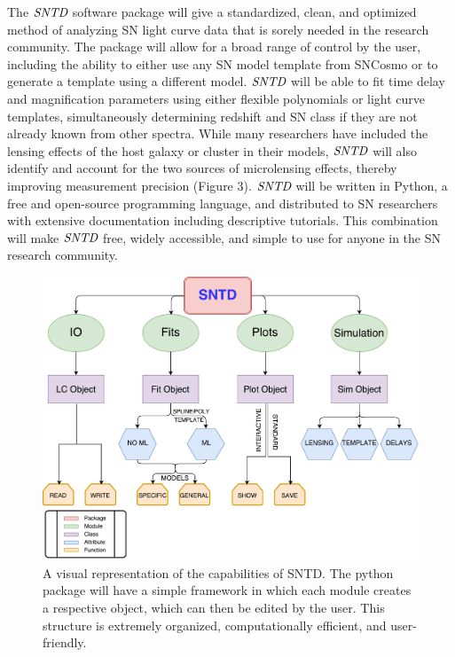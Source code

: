The $\textit{SNTD}$ software package will give a standardized, clean, and optimized method of analyzing SN light curve data that is sorely needed in the research community. The package will allow for a broad range of control by the user, including the ability to either use any SN model template from SNCosmo or to generate a template using a different model. $\textit{SNTD}$ will be able to fit time delay and magnification parameters using either flexible polynomials or light curve templates, simultaneously determining redshift and SN class if they are not already known from other spectra. While many researchers have included the lensing effects of the host galaxy or cluster in their models, $\textit{SNTD}$ will also identify and account for the two sources of microlensing effects, thereby improving measurement precision (Figure 3). $\textit{SNTD}$ will be written in Python, a free and open-source programming language, and distributed to SN researchers with extensive documentation including descriptive tutorials. This combination will make $\textit{SNTD}$ free, widely accessible, and simple to use for anyone in the SN research community.		
\begin{figure}[h]
\centering
\includegraphics[scale=.35]{gra_2017_Flow2.pdf}
\caption{A visual representation of the capabilities of SNTD. The python package will have a simple framework in which each module creates a respective object, which can then be edited by the user. This structure is extremely organized, computationally efficient, and user-friendly.}
\end{figure}


